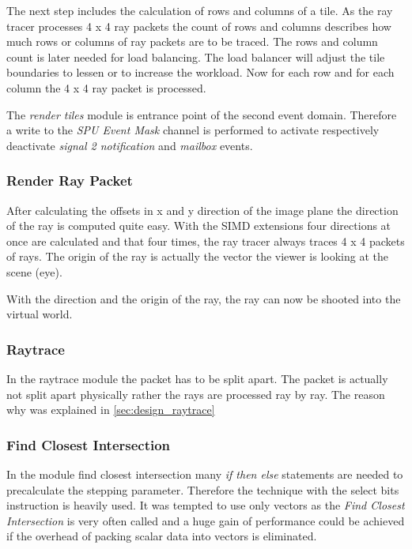 \documentclass[DIV10, abstracton, openright, footsepline, headsepline, twoside, 9pt,
bigheadings]{scrreprt}
\begin{document}
The next step includes the calculation of rows and columns of a tile. As the ray
tracer processes 4 x 4 ray packets the count of rows and columns describes
how much rows or columns of ray packets are to be traced. The rows and column
count is later needed for load balancing. The load balancer will adjust the tile
boundaries to lessen or to increase the workload. Now for each row and for each column the 4 x 4 ray packet is processed.

The \textit{render tiles} module is entrance point of the second event domain.
Therefore a write to the \textit{SPU Event Mask} channel is performed to activate
respectively deactivate \textit{signal 2 notification} and \textit{mailbox} events.


\subsubsection{Render Ray Packet}
\label{sec:impl_render_ray_packet}
After calculating the offsets in x and y direction of the image plane
the direction of the ray is computed quite easy. With the SIMD extensions
four directions at once are calculated and that four times, the ray tracer
always traces 4 x 4 packets of rays. The origin of the ray is actually
the vector the viewer is looking at the scene (eye).

With the direction and the origin of the ray, the ray can now be shooted
into the virtual world.

\subsubsection{Raytrace}
\label{sec:impl_raytrace}
In the raytrace module the packet has to be split apart. The packet is actually
not split apart physically rather the rays are processed ray by ray. The reason why was explained in \ref{sec:design_raytrace}

\subsubsection*{Find Closest Intersection}
\label{sec:impl_find_closest_intersection}
In the module find closest intersection many \textit{if then else} statements
are needed to precalculate the stepping parameter. Therefore the technique
with the select bits instruction is heavily used. It was tempted to use only
vectors as the \textit{Find Closest Intersection} is very often called and
a huge gain of performance could be achieved if the overhead of packing scalar
data into vectors is eliminated.
\end{document}
